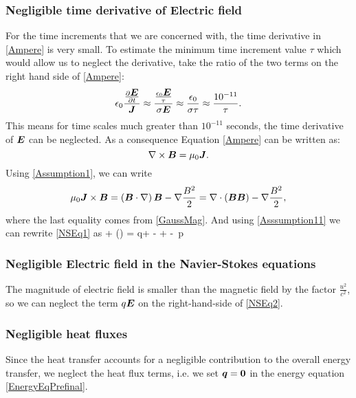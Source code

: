 \subsubsection{Negligible time derivative of Electric field}
For the time increments that we are concerned with, the time derivative in \ref{Ampere} is
very small. To estimate the minimum time increment value $\tau$ which would allow us to neglect the derivative, take the ratio of the two terms on the right hand side of \ref{Ampere}:
\begin{equation}
\epsilon_0 \frac{\frac{\partial{\mbox{\boldmath $E$}}}{\partial{t}}}{\mbox{\boldmath $J$}} \approx \frac{\frac{\epsilon_0 \mbox{\boldmath $E$}}{\tau}}{\sigma\mbox{\boldmath $E$}} \approx \frac{\epsilon_0}{\sigma \tau} \approx \frac{10^{-11}}{\tau}.
\end{equation}
This means for time scales much greater than $10^{-11}$ seconds, the time derivative of $\mbox{\boldmath $E$}$ can be neglected. As a consequence Equation \ref{Ampere} can be written as:
\begin{equation}
\label{Assumption1} \nabla \times \mbox{\boldmath $B$} = \mu_0 \mbox{\boldmath $J$}.
\end{equation}
Using \ref{Assumption1}, we can write
\begin{equation}
\label{Asssumption11} \mu_0 \mbox{\boldmath $J$} \times \mbox{\boldmath $B$} = \left(\mbox{\boldmath $B$}\cdot\nabla\right)\mbox{\boldmath $B$} - \nabla\frac{B^2}{2} = \nabla\cdot\left(\mbox{\boldmath $B$}\mbox{\boldmath $B$}\right) - \nabla\frac{B^2}{2},
\end{equation}
where the last equality comes from \ref{GaussMag}. And using \ref{Asssumption11} we can rewrite \ref{NSEq1} as
\be
\label{NSEq2}  + \nabla\cdot\left(\bfpi\otimes\bfu\right) =  q\bfE + \nabla\cdot\lo{}\bfB\bfB - \ro + \rho\bfg - \nabla\,p
\ee

\subsubsection{Negligible Electric field in the Navier-Stokes equations}
The magnitude of electric field is smaller than the magnetic field by the factor $\frac{u^2}{c^2}$, so we can neglect the term $q\mbox{\boldmath $E$}$ on the right-hand-side of \ref{NSEq2}.

\subsubsection{Negligible heat fluxes}
Since the heat transfer accounts for a negligible contribution to the overall energy transfer, we neglect the heat flux terms, i.e. we set $\mbox{\boldmath $q$} = \mathbf{0}$ in the energy equation \ref{EnergyEqPrefinal}.

